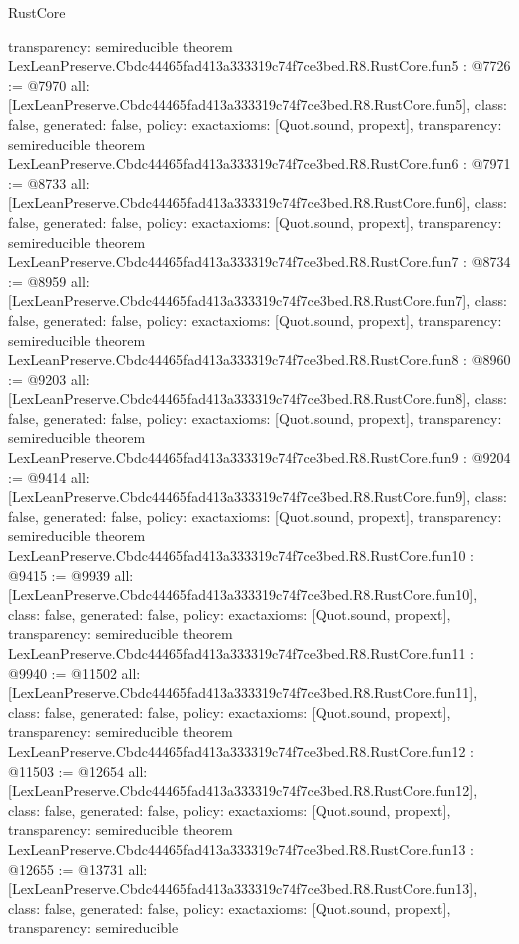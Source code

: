 \begin{lexlean}{RustCore}
\begin{coremodule}
{  transparency: semireducible
}
theorem LexLeanPreserve.Cbdc44465fad413a333319c74f7ce3bed.R8.RustCore.fun5 : @7726 := @7970 {
  all: [LexLeanPreserve.Cbdc44465fad413a333319c74f7ce3bed.R8.RustCore.fun5],
  class: false,
  generated: false,
  policy: exact{axioms: [Quot.sound, propext]},
  transparency: semireducible
}
theorem LexLeanPreserve.Cbdc44465fad413a333319c74f7ce3bed.R8.RustCore.fun6 : @7971 := @8733 {
  all: [LexLeanPreserve.Cbdc44465fad413a333319c74f7ce3bed.R8.RustCore.fun6],
  class: false,
  generated: false,
  policy: exact{axioms: [Quot.sound, propext]},
  transparency: semireducible
}
theorem LexLeanPreserve.Cbdc44465fad413a333319c74f7ce3bed.R8.RustCore.fun7 : @8734 := @8959 {
  all: [LexLeanPreserve.Cbdc44465fad413a333319c74f7ce3bed.R8.RustCore.fun7],
  class: false,
  generated: false,
  policy: exact{axioms: [Quot.sound, propext]},
  transparency: semireducible
}
theorem LexLeanPreserve.Cbdc44465fad413a333319c74f7ce3bed.R8.RustCore.fun8 : @8960 := @9203 {
  all: [LexLeanPreserve.Cbdc44465fad413a333319c74f7ce3bed.R8.RustCore.fun8],
  class: false,
  generated: false,
  policy: exact{axioms: [Quot.sound, propext]},
  transparency: semireducible
}
theorem LexLeanPreserve.Cbdc44465fad413a333319c74f7ce3bed.R8.RustCore.fun9 : @9204 := @9414 {
  all: [LexLeanPreserve.Cbdc44465fad413a333319c74f7ce3bed.R8.RustCore.fun9],
  class: false,
  generated: false,
  policy: exact{axioms: [Quot.sound, propext]},
  transparency: semireducible
}
theorem LexLeanPreserve.Cbdc44465fad413a333319c74f7ce3bed.R8.RustCore.fun10 : @9415 := @9939 {
  all: [LexLeanPreserve.Cbdc44465fad413a333319c74f7ce3bed.R8.RustCore.fun10],
  class: false,
  generated: false,
  policy: exact{axioms: [Quot.sound, propext]},
  transparency: semireducible
}
theorem LexLeanPreserve.Cbdc44465fad413a333319c74f7ce3bed.R8.RustCore.fun11 : @9940 := @11502 {
  all: [LexLeanPreserve.Cbdc44465fad413a333319c74f7ce3bed.R8.RustCore.fun11],
  class: false,
  generated: false,
  policy: exact{axioms: [Quot.sound, propext]},
  transparency: semireducible
}
theorem LexLeanPreserve.Cbdc44465fad413a333319c74f7ce3bed.R8.RustCore.fun12 : @11503 := @12654 {
  all: [LexLeanPreserve.Cbdc44465fad413a333319c74f7ce3bed.R8.RustCore.fun12],
  class: false,
  generated: false,
  policy: exact{axioms: [Quot.sound, propext]},
  transparency: semireducible
}
theorem LexLeanPreserve.Cbdc44465fad413a333319c74f7ce3bed.R8.RustCore.fun13 : @12655 := @13731 {
  all: [LexLeanPreserve.Cbdc44465fad413a333319c74f7ce3bed.R8.RustCore.fun13],
  class: false,
  generated: false,
  policy: exact{axioms: [Quot.sound, propext]},
  transparency: semireducible
}
\end{coremodule}
\end{lexlean}

